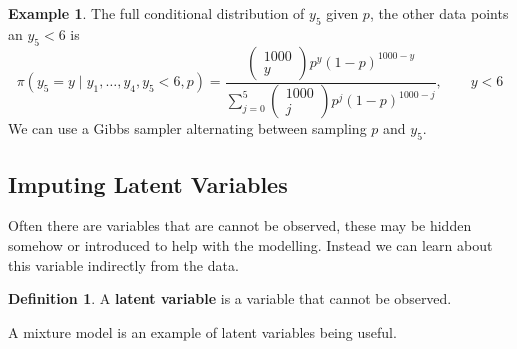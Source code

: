 \documentclass[
]{book}
\theoremstyle{definition}
\newtheorem{definition}{Definition}[chapter]
\theoremstyle{definition}
\newtheorem{example}{Example}[chapter]
\theoremstyle{definition}
\theoremstyle{definition}
\theoremstyle{remark}
\begin{document}
\begin{example}
The full conditional distribution of \(y_5\) given \(p\), the other data points an \(y_5 < 6\) is
\[
  \pi(y_5 = y \mid y_1, \ldots, y_4, y_5 < 6, p) = \frac{\begin{pmatrix} 1000 \\ y \end{pmatrix} p^{y}(1-p)^{1000 - y}}{\sum_{j=0}^{5}\begin{pmatrix} 1000 \\ j \end{pmatrix} p^{j}(1-p)^{1000-j}}, \qquad y < 6
\]
We can use a Gibbs sampler alternating between sampling \(p\) and \(y_5\).
\end{example}

\hypertarget{imputing-latent-variables}{%
\subsection{Imputing Latent Variables}\label{imputing-latent-variables}}

Often there are variables that are cannot be observed, these may be hidden somehow or introduced to help with the modelling. Instead we can learn about this variable indirectly from the data.

\begin{definition}
A \textbf{latent variable} is a variable that cannot be observed.
\end{definition}

A mixture model is an example of latent variables being useful.
\end{document}

